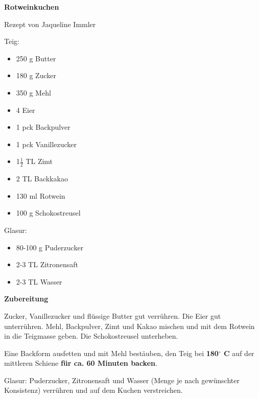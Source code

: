 

\parindent0pt	

\pagestyle{empty}


\textbf{{\LARGE Rotweinkuchen}}%

\hrulefill

Rezept von Jaqueline Immler	
\vspace*{\fill}
\begin{multicols}{2}	

Teig:
\begin{itemize}
\item 250 g Butter
\item 180 g Zucker
\item 350 g Mehl
\item 4 Eier
\item 1 pck Backpulver
\item 1 pck Vanillezucker
\item 1$\frac{1}{2}$ TL Zimt
\item 2 TL Backkakao
\item 130 ml Rotwein
\item 100 g Schokostreusel
\end{itemize}
Glasur:
\begin{itemize}
\item 80-100 g Puderzucker
\item 2-3 TL Zitronensaft
\item 2-3 TL Wasser
\end{itemize}
\end{multicols}
\vfill									%

\vspace{1.5cm}
%
%


\vfill
\newpage
\textbf{{\LARGE Zubereitung}}%

\hrulefill

\vspace*{\fill}
\begin{multicols}{2}

Zucker, Vanillezucker und flüssige Butter gut verrühren. Die Eier gut unterrühren.\newline
Mehl, Backpulver, Zimt und Kakao mischen und mit dem Rotwein in die Teigmasse geben.\newline
Die Schokostreusel unterheben.\newline

Eine Backform ausfetten und mit Mehl bestäuben, den Teig bei \textbf{180$^\circ$ C} auf der mittleren
Schiene \textbf{für ca. 60 Minuten backen}. \newline

Glasur: \newline
Puderzucker, Zitronensaft und Wasser (Menge je nach gewünschter Konsistenz) verrühren und auf dem Kuchen
verstreichen.

\end{multicols}
\vfill
